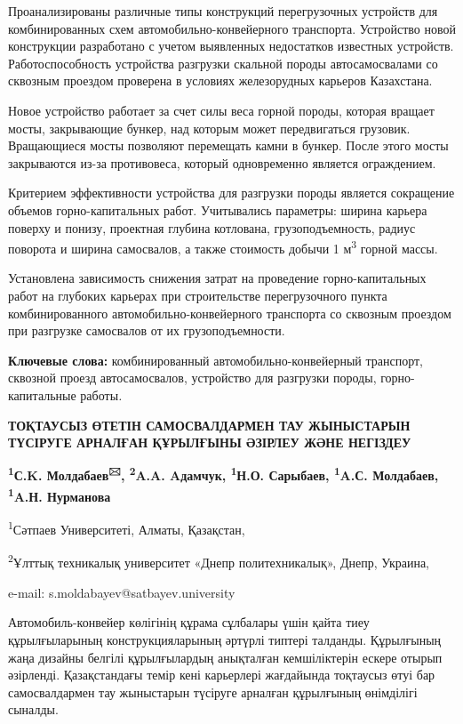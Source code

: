 Проанализированы различные типы конструкций перегрузочных устройств для
комбинированных схем автомобильно-конвейерного транспорта. Устройство
новой конструкции разработано с учетом выявленных недостатков известных
устройств. Работоспособность устройства разгрузки скальной породы
автосамосвалами со сквозным проездом проверена в условиях железорудных
карьеров Казахстана.

Новое устройство работает за счет силы веса горной породы, которая
вращает мосты, закрывающие бункер, над которым может передвигаться
грузовик. Вращающиеся мосты позволяют перемещать камни в бункер. После
этого мосты закрываются из-за противовеса, который одновременно является
ограждением.

Критерием эффективности устройства для разгрузки породы является
сокращение объемов горно-капитальных работ. Учитывались параметры:
ширина карьера поверху и понизу, проектная глубина котлована,
грузоподъемность, радиус поворота и ширина самосвалов, а также стоимость
добычи 1 м\textsuperscript{3} горной массы.

Установлена зависимость снижения затрат на проведение горно-капитальных
работ на глубоких карьерах при строительстве перегрузочного пункта
комбинированного автомобильно-конвейерного транспорта со сквозным
проездом при разгрузке самосвалов от их грузоподъемности.

{\bfseries Ключевые слова:} комбинированный автомобильно-конвейерный
транспорт, сквозной проезд автосамосвалов, устройство для разгрузки
породы, горно-капитальные работы\emph{.}

\begin{center}
{\large\bfseries ТОҚТАУСЫЗ ӨТЕТІН САМОСВАЛДАРМЕН ТАУ ЖЫНЫСТАРЫН ТҮСІРУГЕ АРНАЛҒАН
ҚҰРЫЛҒЫНЫ ӘЗІРЛЕУ ЖӘНЕ НЕГІЗДЕУ}

{\bfseries \textsuperscript{1}С.K. Молдабаев\textsuperscript{🖂},
\textsuperscript{2}A.A. Aдамчук, \textsuperscript{1}Н.О. Сарыбаев,
\textsuperscript{1}A.С. Молдабаев, \textsuperscript{1}A.Н. Нурманова}

\textsuperscript{1}Сәтпаев Университеті, Алматы, Қазақстан,

\textsuperscript{2}Ұлттық техникалық университет «Днепр политехникалық»,
Днепр, Украина,

e-mail: s.moldabayev@satbayev.university
\end{center}

Автомобиль-конвейер көлігінің құрама сұлбалары үшін қайта тиеу
құрылғыларының конструкцияларының әртүрлі типтері талданды. Құрылғының
жаңа дизайны белгілі құрылғылардың анықталған кемшіліктерін ескере
отырып әзірленді. Қазақстандағы темір кені карьерлері жағдайында
тоқтаусыз өтуі бар самосвалдармен тау жыныстарын түсіруге арналған
құрылғының өнімділігі сыналды.


